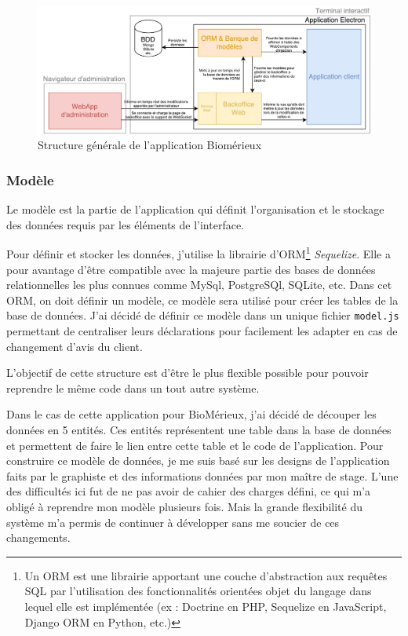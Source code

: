 \begin{figure}[h]
    \centering
    \includegraphics[scale=0.6]{img/Proposition-utopia.pdf}
    \caption{Structure générale de l'application Biomérieux}
\end{figure}

\subsubsection{Modèle}

Le modèle est la partie de l'application qui définit l'organisation et le stockage des données requis par les éléments de l'interface.

Pour définir et stocker les données, j'utilise la librairie d'ORM\footnote{Un ORM est une librairie apportant une couche d'abstraction aux requêtes SQL par l'utilisation des fonctionnalités orientées objet du langage dans lequel elle est implémentée (ex : Doctrine en PHP, Sequelize en JavaScript, Django ORM en Python, etc.)} \emph{Sequelize}.
Elle a pour avantage d'être compatible avec la majeure partie des bases de données relationnelles les plus connues comme MySql, PostgreSQl, SQLite, etc.
Dans cet ORM, on doit définir un modèle, ce modèle sera utilisé pour créer les tables de la base de données.
J'ai décidé de définir ce modèle dans un unique fichier \texttt{model.js} permettant de centraliser leurs déclarations pour facilement les adapter en cas de changement d'avis du client.

L'objectif de cette structure est d'être le plus flexible possible pour pouvoir reprendre le même code dans un tout autre système.

\bigskip

Dans le cas de cette application pour BioMérieux, j'ai décidé de découper les données en 5 entités.
Ces entités représentent une table dans la base de données et permettent de faire le lien entre cette table et le code de l'application.
Pour construire ce modèle de données, je me suis basé sur les designs de l'application faits par le graphiste et des informations données par mon maître de stage.
L'une des difficultés ici fut de ne pas avoir de cahier des charges défini, ce qui m’a obligé à reprendre mon modèle plusieurs fois.
Mais la grande flexibilité du système m'a permis de continuer à développer sans me soucier de ces changements.

